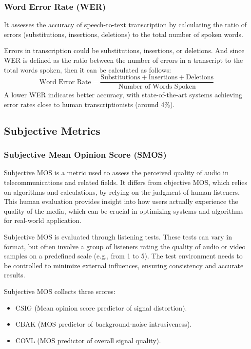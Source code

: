 \subsubsection{Word Error Rate (WER)}
It assesses the accuracy of speech-to-text transcription by calculating the ratio of errors (substitutions, insertions, deletions) to the total number of spoken words. 

Errors in transcription could be substitutions, insertions, or deletions. And since WER is defined as the ratio between the number of errors in a transcript to the total words spoken, then it can be calculated as follows: 
\begin{equation}
\text{Word Error Rate} = \frac{\text{Substitutions} + \text{Insertions} + \text{Deletions}} {\text{Number of Words Spoken}}
\end{equation}
A lower WER indicates better accuracy, with state-of-the-art systems achieving error rates close to human transcriptionists (around 4\%).


\subsection{Subjective Metrics}
\subsubsection{Subjective Mean Opinion Score (SMOS)}
Subjective MOS is a metric used to assess the perceived quality of audio in telecommunications and related fields. It differs from objective MOS, which relies on algorithms and calculations, by relying on the judgment of human listeners. This human evaluation provides insight into how users actually experience the quality of the media, which can be crucial in optimizing systems and algorithms for real-world application.

Subjective MOS is evaluated through listening tests. These tests can vary in format, but often involve a group of listeners rating the quality of audio or video samples on a predefined scale (e.g., from 1 to 5). The test environment needs to be controlled to minimize external influences, ensuring consistency and accurate results.

Subjective MOS collects three scores:

\begin{itemize}
    \item CSIG (Mean opinion score predictor of signal distortion).
    \item CBAK (MOS predictor of background-noise intrusiveness).
    \item COVL (MOS predictor of overall signal quality).
\end{itemize}